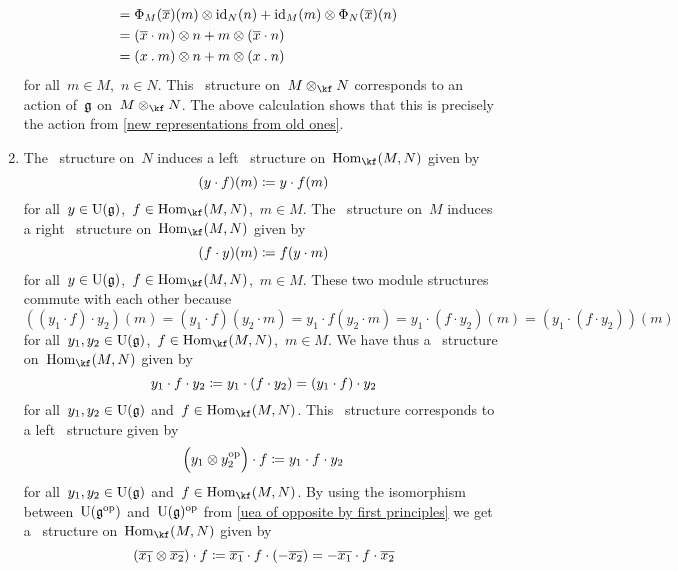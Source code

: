 \begin{remark}
\begin{enumerate}
\begin{align*}
				\\
				&=
				\Phi_M(\overline{x})(m) \otimes \mathrm{id}_N(n) + \mathrm{id}_M(m) \otimes \Phi_N(\overline{x})(n)
				\\
				&=
				(\overline{x} \cdot m) \otimes n + m \otimes (\overline{x} \cdot n)
				\\
				&=
				(x \mathbin{.} m) \otimes n + m \otimes (x \mathbin{.} n)
			\end{align*}
			for all~$m \in M$,~$n \in N$.
			This~\module{$\Univ(\glie)$} structure on~$M \tensor_{\kf} N$ corresponds to an action of~$\mathfrak{g}$ on~$M \otimes_{\kf} N$.
			The above calculation shows that this is precisely the action from \cref{new representations from old ones}.
		\item
			The~\module{$\Univ(\glie)$} structure on~$N$ induces a left~\module{$\Univ(\glie)$} structure on~$\Hom_{\kf}(M, N)$ given by
			\[
				(y \cdot f)(m)
				\coloneqq
				y \cdot f(m)
			\]
			for all~$y \in \operatorname{U}(\mathfrak{g})$,~$f \in \Hom_{\kf}(M, N)$,~$m \in M$.
			The~\module{$\Univ(\glie)$} structure on~$M$ induces a right~\module{$\Univ(\glie)$} structure on~$\Hom_{\kf}(M, N)$ given by
			\[
				(f \cdot y)(m)
				\coloneqq
				f(y \cdot m)
			\]
			for all~$y \in \operatorname{U}(\mathfrak{g})$,~$f \in \Hom_{\kf}(M, N)$,~$m \in M$.
			These two module structures commute with each other because
			\[
				((y_1 \cdot f) \cdot y_2)(m)
				=
				(y_1 \cdot f)(y_2 \cdot m)
				=
				y_1 \cdot f(y_2 \cdot m)
				=
				y_1 \cdot (f \cdot y_2)(m)
				=
				(y_1 \cdot (f \cdot y_2))(m)
			\]
			for all~$y_1, y_2 \in \operatorname{U}(\mathfrak{g})$,~$f \in \Hom_{\kf}(M,N)$,~$m \in M$.
			We have thus a~\bimodule{$\Univ(\glie)$}{$\Univ(\glie)$} structure on~$\Hom_{\kf}(M,N)$ given by
			\[
				y_1 \cdot f \cdot y_2
				\coloneqq
				y_1 \cdot (f \cdot y_2)
				=
				(y_1 \cdot f) \cdot y_2
			\]
			for all~$y_1, y_2 \in \operatorname{U}(\mathfrak{g})$ and~$f \in \Hom_{\kf}(M, N)$.
			This~\bimodule{$\Univ(\glie)$}{$\Univ(\glie)$} structure corresponds to a left~\module{$\Univ(\glie) \tensor \Univ(\glie)^{\op}$} structure given by
			\[
				\Bigl( y_1 \otimes y_2^{\mathrm{op}} \Bigr) \cdot f
				\coloneqq
				y_1 \cdot f \cdot y_2
			\]
			for all~$y_1, y_2 \in \operatorname{U}(\mathfrak{g})$ and~$f \in \Hom_{\kf}(M, N)$.
			By using the isomorphism between~$\operatorname{U}(\mathfrak{g}^{\mathrm{op}})$ and~$\operatorname{U}(\mathfrak{g})^{\mathrm{op}}$ from \cref{uea of opposite by first principles} we get a~\module{$\Univ(\glie) \tensor \Univ(\glie)$} structure on~$\Hom_{\kf}(M,N)$ given by
			\[
				( \overline{x_1} \otimes \overline{x_2} ) \cdot f
				\coloneqq
				\overline{x_1} \cdot f \cdot (-\overline{x_2})
				=
				- \overline{x_1} \cdot f \cdot \overline{x_2}
\]
\end{enumerate}
\end{remark}
